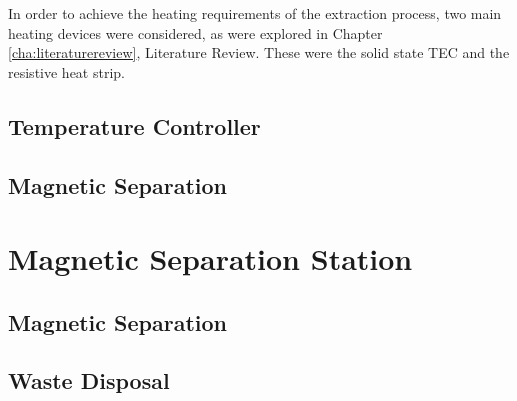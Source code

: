 In order to achieve the heating requirements of the extraction process, two main heating devices were considered, as were explored in Chapter \ref{cha:literaturereview}, Literature Review. These were the solid state TEC and the resistive heat strip.

\subsection{Temperature Controller}

\subsection{Magnetic Separation}

\section{Magnetic Separation Station}

\subsection{Magnetic Separation}

\subsection{Waste Disposal}